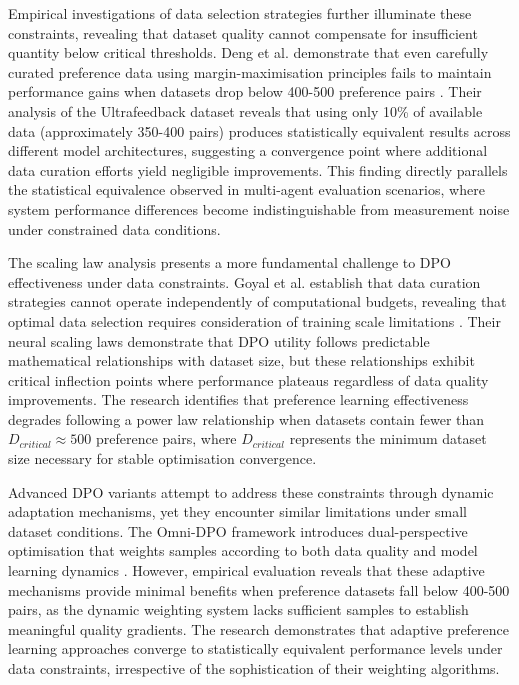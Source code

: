 Empirical investigations of data selection strategies further illuminate these constraints, revealing that dataset quality cannot compensate for insufficient quantity below critical thresholds. Deng et al. demonstrate that even carefully curated preference data using margin-maximisation principles fails to maintain performance gains when datasets drop below 400-500 preference pairs \cite{deng2025preference_data_selection}. Their analysis of the Ultrafeedback dataset reveals that using only 10\% of available data (approximately 350-400 pairs) produces statistically equivalent results across different model architectures, suggesting a convergence point where additional data curation efforts yield negligible improvements. This finding directly parallels the statistical equivalence observed in multi-agent evaluation scenarios, where system performance differences become indistinguishable from measurement noise under constrained data conditions.

The scaling law analysis presents a more fundamental challenge to DPO effectiveness under data constraints. Goyal et al. establish that data curation strategies cannot operate independently of computational budgets, revealing that optimal data selection requires consideration of training scale limitations \cite{goyal2024scaling_laws_data_filtering}. Their neural scaling laws demonstrate that DPO utility follows predictable mathematical relationships with dataset size, but these relationships exhibit critical inflection points where performance plateaus regardless of data quality improvements. The research identifies that preference learning effectiveness degrades following a power law relationship when datasets contain fewer than $D_{critical} \approx 500$ preference pairs, where $D_{critical}$ represents the minimum dataset size necessary for stable optimisation convergence.

Advanced DPO variants attempt to address these constraints through dynamic adaptation mechanisms, yet they encounter similar limitations under small dataset conditions. The Omni-DPO framework introduces dual-perspective optimisation that weights samples according to both data quality and model learning dynamics \cite{peng2025omni_dpo}. However, empirical evaluation reveals that these adaptive mechanisms provide minimal benefits when preference datasets fall below 400-500 pairs, as the dynamic weighting system lacks sufficient samples to establish meaningful quality gradients. The research demonstrates that adaptive preference learning approaches converge to statistically equivalent performance levels under data constraints, irrespective of the sophistication of their weighting algorithms.

